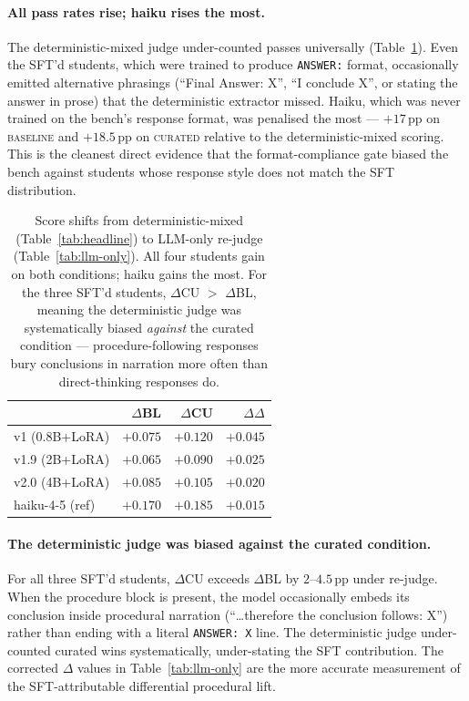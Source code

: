 \documentclass[10pt]{article}
\newcommand{\BL}{\textsc{baseline}\xspace}
\newcommand{\CU}{\textsc{curated}\xspace}
\begin{document}
\paragraph{All pass rates rise; haiku rises the most.} The deterministic-mixed judge under-counted passes universally (Table~\ref{tab:rejudge-deltas}). Even the SFT'd students, which were trained to produce \texttt{ANSWER:} format, occasionally emitted alternative phrasings (``Final Answer: X'', ``I conclude X'', or stating the answer in prose) that the deterministic extractor missed. Haiku, which was never trained on the bench's response format, was penalised the most --- $+17$\,pp on \BL{} and $+18.5$\,pp on \CU{} relative to the deterministic-mixed scoring. This is the cleanest direct evidence that the format-compliance gate biased the bench against students whose response style does not match the SFT distribution.

\begin{table}[h]
\centering
\small
\begin{tabular}{@{}l r r r@{}}
\toprule
& $\Delta$BL & $\Delta$CU & $\Delta\Delta$ \\
\midrule
v1   (0.8B+LoRA)   & $+0.075$ & $+0.120$ & $+0.045$ \\
v1.9 (2B+LoRA)     & $+0.065$ & $+0.090$ & $+0.025$ \\
v2.0 (4B+LoRA)     & $+0.085$ & $+0.105$ & $+0.020$ \\
haiku-4-5 (ref)    & $+0.170$ & $+0.185$ & $+0.015$ \\
\bottomrule
\end{tabular}
\caption{Score shifts from deterministic-mixed (Table~\ref{tab:headline}) to LLM-only re-judge (Table~\ref{tab:llm-only}). All four students gain on both conditions; haiku gains the most. For the three SFT'd students, $\Delta$CU $>$ $\Delta$BL, meaning the deterministic judge was systematically biased \emph{against} the curated condition --- procedure-following responses bury conclusions in narration more often than direct-thinking responses do.}
\label{tab:rejudge-deltas}
\end{table}

\paragraph{The deterministic judge was biased against the curated condition.} For all three SFT'd students, $\Delta$CU exceeds $\Delta$BL by $2$--$4.5$\,pp under re-judge. When the procedure block is present, the model occasionally embeds its conclusion inside procedural narration (``\dots therefore the conclusion follows: X'') rather than ending with a literal \texttt{ANSWER: X} line. The deterministic judge under-counted curated wins systematically, under-stating the SFT contribution. The corrected $\Delta$ values in Table~\ref{tab:llm-only} are the more accurate measurement of the SFT-attributable differential procedural lift.
\end{document}
